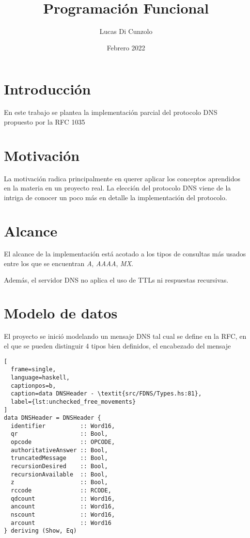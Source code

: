 \documentclass[6pt]{article}
\title{Programación Funcional}
\author{Lucas Di Cunzolo}
\date{Febrero 2022}
\begin{document}
\maketitle

\section{Introducción}

En este trabajo se plantea la implementación parcial del protocolo DNS propuesto
por la RFC 1035 \cite{rfc1035}

\section{Motivación}

La motivación radica principalmente en querer aplicar los conceptos aprendidos en
la materia en un proyecto real. La elección del protocolo DNS viene de la intriga
de conocer un poco más en detalle la implementación del protocolo.

\section{Alcance}

El alcance de la implementación está acotado a los tipos de consultas más usados
entre los que se encuentran \textit{A}, \textit{AAAA}, \textit{MX}.

Además, el servidor DNS no aplica el uso de TTLs ni respuestas recursivas.

\section{Modelo de datos}

El proyecto se inició modelando un mensaje DNS tal cual se define en la RFC, en
el que se pueden distinguir 4 tipos bien definidos, el encabezado del mensaje

\begin{lstlisting}[
  frame=single,
  language=haskell,
  captionpos=b,
  caption=data DNSHeader - \textit{src/FDNS/Types.hs:81},
  label={lst:unchecked_free_movements}
]
data DNSHeader = DNSHeader {
  identifier          :: Word16,
  qr                  :: Bool,
  opcode              :: OPCODE,
  authoritativeAnswer :: Bool,
  truncatedMessage    :: Bool,
  recursionDesired    :: Bool,
  recursionAvailable  :: Bool,
  z                   :: Bool,
  rccode              :: RCODE,
  qdcount             :: Word16,
  ancount             :: Word16,
  nscount             :: Word16,
  arcount             :: Word16
} deriving (Show, Eq)
\end{lstlisting}
\end{document}
